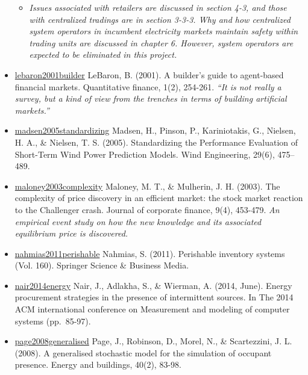 \documentclass[letterpaper,8pt,twocolumn,twoside,]{pinp}
\providecommand{\tightlist}{%
  \setlength{\itemsep}{0pt}\setlength{\parskip}{0pt}}
\begin{document}
\begin{itemize}
  \begin{itemize}
  \tightlist
  \item
    \emph{Issues associated with retailers are discussed in section 4-3,
    and those with centralized tradings are in section 3-3-3. Why and
    how centralized system operators in incumbent electricity markets
    maintain safety within trading units are discussed in chapter 6.
    However, system operators are expected to be eliminated in this
    project.}
  \end{itemize}
\item
  \href{https://www.tandfonline.com/doi/abs/10.1088/1469-7688/1/2/307}{lebaron2001builder}
  LeBaron, B. (2001). A builder's guide to agent-based financial
  markets. Quantitative finance, 1(2), 254-261. \emph{``It is not really
  a survey, but a kind of view from the trenches in terms of building
  artificial markets.''}
\item
  \href{https://journals.sagepub.com/doi/abs/10.1260/030952405776234599}{madsen2005standardizing}
  Madsen, H., Pinson, P., Kariniotakis, G., Nielsen, H. A., \& Nielsen,
  T. S. (2005). Standardizing the Performance Evaluation of Short-Term
  Wind Power Prediction Models. Wind Engineering, 29(6), 475--489.
\item
  \href{https://www.sciencedirect.com/science/article/pii/S092911990200055X}{maloney2003complexity}
  Maloney, M. T., \& Mulherin, J. H. (2003). The complexity of price
  discovery in an efficient market: the stock market reaction to the
  Challenger crash. Journal of corporate finance, 9(4), 453-479.
  \emph{An empirical event study on how the new knowledge and its
  associated equilibrium price is discovered.}
\item
  \href{https://www.springer.com/gp/book/9781441979988}{nahmias2011perishable}
  Nahmias, S. (2011). Perishable inventory systems (Vol. 160). Springer
  Science \& Business Media.
\item
  \href{https://dl.acm.org/doi/10.1145/2591971.2591982}{nair2014energy}
  Nair, J., Adlakha, S., \& Wierman, A. (2014, June). Energy procurement
  strategies in the presence of intermittent sources. In The 2014 ACM
  international conference on Measurement and modeling of computer
  systems (pp.~85-97).
\item
  \href{https://www.sciencedirect.com/science/article/pii/S037877880700031X}{page2008generalised}
  Page, J., Robinson, D., Morel, N., \& Scartezzini, J. L. (2008). A
  generalised stochastic model for the simulation of occupant presence.
  Energy and buildings, 40(2), 83-98.

\end{itemize}
\end{document}

